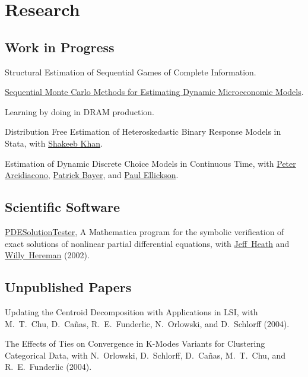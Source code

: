 \documentclass[letterpaper]{article}
\renewenvironment{itemize}{
  \begin{list}{}{
    \setlength{\leftmargin}{1em}
  }
}{
  \end{list}
}
\begin{document}
\section*{Research}

\subsection*{Work in Progress}

\begin{itemize}
\item Structural Estimation of Sequential Games of Complete Information.
\item \href{http://jblevins.org/research/smcdmm}{Sequential Monte Carlo
    Methods for Estimating Dynamic Microeconomic Models}.
\item Learning by doing in DRAM production.
\item Distribution Free Estimation of Heteroskedastic Binary Response
  Models in Stata, with
  \href{http://www.econ.duke.edu/~shakeebk/}{Shakeeb Khan}.
\item Estimation of Dynamic Discrete Choice Models in Continuous
  Time, with
  \href{http://www.econ.duke.edu/~psarcidi/}{Peter Arcidiacono},
  \href{http://www.econ.duke.edu/~pb29/}{Patrick Bayer}, and
  \href{http://www.econ.duke.edu/~paule/}{Paul Ellickson}.
\end{itemize}

\subsection*{Scientific Software}

\begin{itemize}
\item \href{http://jblevins.org/research/pdest}{PDESolutionTester}, A
  Mathematica program for the symbolic verification of exact solutions
  of nonlinear partial differential equations, with
  \href{http://web.centre.edu/jeffrey.heath/}{Jeff\ Heath} and
  \href{http://www.mines.edu/fs_home/whereman/}{Willy\ Hereman} (2002).
\end{itemize}

\subsection*{Unpublished Papers}

\begin{itemize}
\item Updating the Centroid Decomposition with Applications in LSI,
  with M.\ T.\ Chu, D.\ Ca\~{n}as, R.\ E.\ Funderlic, N.\ Orlowski, and
  D.\ Schlorff (2004).

\item The Effects of Ties on Convergence in K-Modes Variants for
  Clustering Categorical Data, with N.\ Orlowski, D.\ Schlorff, D.\
  Ca\~{n}as, M.\ T.\ Chu, and R.\ E.\ Funderlic (2004).
\end{itemize}
\end{document}
